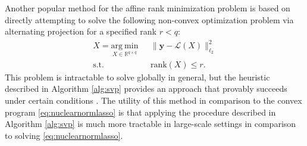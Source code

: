 \documentclass[11pt,letterpaper]{article}
\newcommand{\R}{\mathbb{R}}
\newcommand{\by}{\mathbf{y}}
\renewcommand{\L}{\mathcal{L}}
\newcommand{\argmin}{\mathrm{arg~min}}
\begin{document}
Another popular method for the affine rank minimization problem is based on directly attempting to solve the following non-convex optimization problem via alternating projection for a specified rank $r < q$:
\begin{equation} \label{eq:varietyconstrainedopt}
\begin{aligned}
\hat{X} = \underset{X \in \R^{q \times q}}{\argmin} & ~~~ \|\by - \L(X) \|_{\ell_2}^2 \\ \text{s.t.} & ~~~ \mathrm{rank}(X) \leq r.
\end{aligned}
\end{equation}
This problem is intractable to solve globally in general, but the heuristic described in Algorithm \ref{alg:svp} provides an approach that provably succeeds under certain conditions \cite{GM:11,JMD:10}.  The utility of this method in comparison to the convex program \eqref{eq:nuclearnormlasso} is that applying the procedure described in Algorithm \ref{alg:svp} is much more tractable in large-scale settings in comparison to solving \eqref{eq:nuclearnormlasso}.
\end{document}
